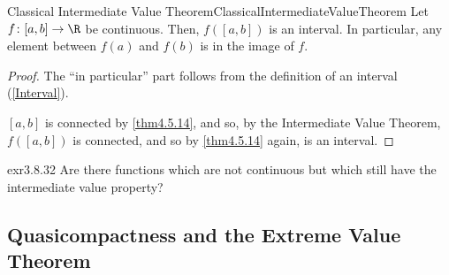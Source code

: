 \begin{crl}{Classical Intermediate Value Theorem}{ClassicalIntermediateValueTheorem}
Let $f\colon [a,b]\rightarrow \R$ be continuous.  Then, $f([a,b])$ is an interval.  In particular, any element between $f(a)$ and $f(b)$ is in the image of $f$.
\begin{proof}
The ``in particular'' part follows from the definition of an interval (\cref{Interval}).

$[a,b]$ is connected by \cref{thm4.5.14}, and so, by the Intermediate Value Theorem, $f([a,b])$ is connected, and so by \cref{thm4.5.14} again, is an interval.
\end{proof}
\end{crl}
\begin{exr}{}{exr3.8.32}
Are there functions which are not continuous but which still have the intermediate value property?
\end{exr}

\subsection{Quasicompactness and the Extreme Value Theorem}

